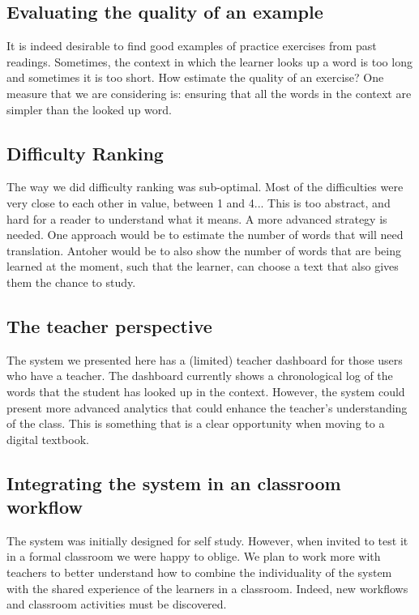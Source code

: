 \subsection{Evaluating the quality of an example}

It is indeed desirable to find good examples of practice exercises from past readings. Sometimes, the context in which the learner looks up a word is too long and sometimes it is too short. How estimate the quality of an exercise? One measure that we are considering is: ensuring that all the words in the context are simpler than the looked up word. 


\subsection{Difficulty Ranking}
The way we did difficulty ranking was sub-optimal. Most of the difficulties were very close to each other in value, between 1 and 4... This is too abstract, and hard for a reader to understand what it means. A more advanced strategy is needed. One approach would be to estimate the number of words that will need translation. Antoher would be to also show the number of words that are being learned at the moment, such that the learner, can choose a text that also gives them the chance to study. 

\subsection{The teacher perspective}
The system we presented here has a (limited) teacher dashboard for those users who have a teacher. The dashboard currently shows a chronological log of the words that the student has looked up in the context. However, the system could present more advanced analytics that could enhance the teacher's understanding of the class. This is something that is a clear opportunity when moving to a digital textbook. 

\subsection{Integrating the system in an classroom workflow}
The system was initially designed for self study. However, when invited to test it in a formal classroom we were happy to oblige. We plan to work more with teachers to better understand how to combine the individuality of the system with the shared experience of the learners in a classroom. Indeed, new workflows and classroom activities must be discovered.

